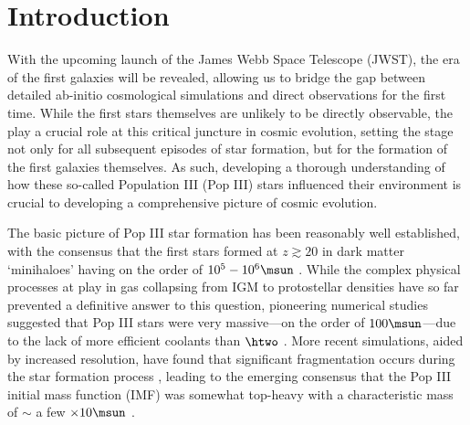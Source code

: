 \section{Introduction}
\label{intro}

With the upcoming launch of the James Webb Space Telescope (JWST), the era of the first galaxies will be revealed, allowing us to bridge the gap between detailed ab-initio cosmological simulations and direct observations for the first time. While the first stars themselves are unlikely to be directly observable, the play a crucial role at this critical juncture in cosmic evolution, setting the stage not only for all subsequent episodes of star formation, but for the formation of the first galaxies themselves.  As such, developing a thorough understanding of how these so-called Population III (Pop III) stars influenced their environment is crucial to developing a comprehensive picture of cosmic evolution.

The basic picture of Pop III star formation has been reasonably well established, with the consensus that the first stars formed at $z\gtrsim20$ in dark matter `minihaloes' having on the order of $10^5 - 10^6\msun$ \citep{CouchmanRees1986, HaimanThoulLoeb1996, Tegmarketal1997}. While the complex physical processes at play in gas collapsing from IGM to protostellar densities have so far prevented a definitive answer to this question, pioneering numerical studies suggested that Pop III stars were very massive---on the order of $100\msun$---due to the lack of more efficient coolants than $\htwo$ \citep[e.g.,][]{BrommCoppiLarson1999, BrommCoppiLarson2002, AbelBryanNorman2002, Yoshidaetal2003, BrommLarson2004, Yoshidaetal2006, O'SheaNorman2007}. More recent simulations, aided by increased resolution, have found that significant fragmentation occurs during the star formation process \citep{StacyGreifBromm2010, Clarketal2011a, Clarketal2011b, Greifetal2011, Greifetal2012, StacyBromm2013, Hiranoetal2014}, leading to the emerging consensus that the Pop III initial mass function (IMF) was somewhat top-heavy with a characteristic mass of $\sim$ a few $\times 10\msun$ \citep{Bromm2013}.

